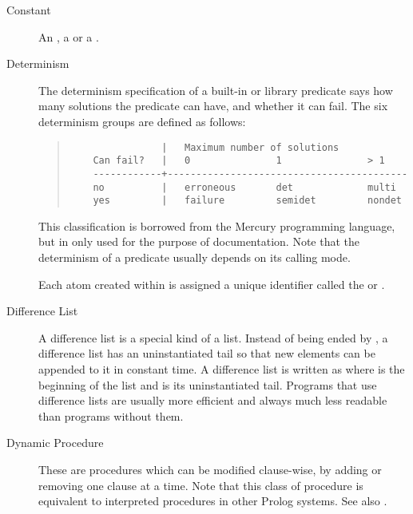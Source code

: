 \begin{description}
\item[Constant]
An , a  or a .

\item[Determinism]
The determinism specification of a built-in or library predicate says
how many solutions the predicate can have, and whether it can fail.
The six determinism groups are defined as follows:
\begin{quote}
\begin{verbatim}
                |   Maximum number of solutions
    Can fail?   |   0               1               > 1
    ------------+------------------------------------------
    no          |   erroneous       det             multi
    yes         |   failure         semidet         nondet
\end{verbatim}
\end{quote}
This classification is borrowed from the Mercury programming language,
but in {\eclipse} only used for the purpose of documentation.
Note that the determinism of a predicate usually depends on its calling mode.

\item[]
Each atom created within {\eclipse} is assigned a unique
identifier called the  or .

\item[Difference List]
A difference list is a special kind of a list.
Instead of being ended by , a difference list
has an uninstantiated tail so that new elements
can be appended to it in constant time.
A difference list is written as 
where  is the beginning of the list and 
is its uninstantiated tail.
Programs that use difference lists are usually more efficient
and always much less readable than programs without them.

\item[Dynamic Procedure]
These are procedures which can be modified clause-wise, by adding or removing
one clause at a time. Note that this class of procedure is equivalent to
interpreted procedures in other Prolog systems. See also .


\end{description}
